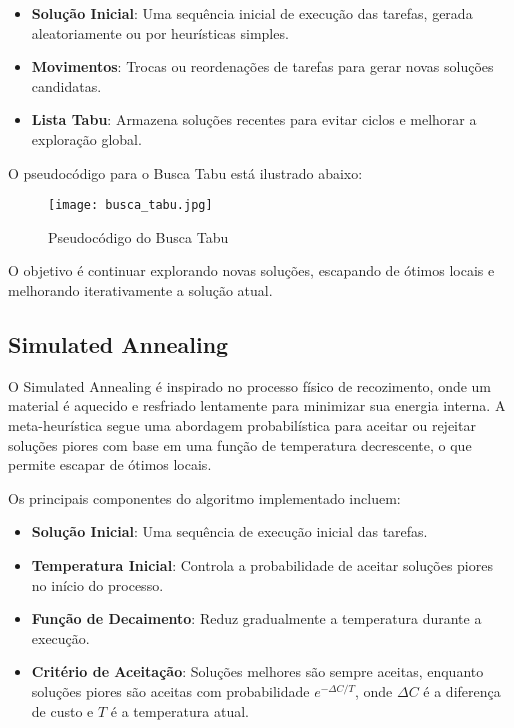 \documentclass[12pt]{article}
\begin{document}
\begin{itemize}
    \item \textbf{Solução Inicial}: Uma sequência inicial de execução das tarefas, gerada aleatoriamente ou por heurísticas simples.
    \item \textbf{Movimentos}: Trocas ou reordenações de tarefas para gerar novas soluções candidatas.
    \item \textbf{Lista Tabu}: Armazena soluções recentes para evitar ciclos e melhorar a exploração global.
\end{itemize}

O pseudocódigo para o Busca Tabu está ilustrado abaixo:

\begin{figure}[h]  
    \centering 
    \texttt{[image: busca\_tabu.jpg]}  
    \caption{Pseudocódigo do Busca Tabu}  %
    \label{fig:busca_tabu}  %
\end{figure}


O objetivo é continuar explorando novas soluções, escapando de ótimos locais e melhorando iterativamente a solução atual.

\subsection{Simulated Annealing}

O Simulated Annealing é inspirado no processo físico de recozimento, onde um material é aquecido e resfriado lentamente para minimizar sua energia interna. A meta-heurística segue uma abordagem probabilística para aceitar ou rejeitar soluções piores com base em uma função de temperatura decrescente, o que permite escapar de ótimos locais.

Os principais componentes do algoritmo implementado incluem:

\begin{itemize}
    \item \textbf{Solução Inicial}: Uma sequência de execução inicial das tarefas.
    \item \textbf{Temperatura Inicial}: Controla a probabilidade de aceitar soluções piores no início do processo.
    \item \textbf{Função de Decaimento}: Reduz gradualmente a temperatura durante a execução.
    \item \textbf{Critério de Aceitação}: Soluções melhores são sempre aceitas, enquanto soluções piores são aceitas com probabilidade $e^{-\Delta C / T}$, onde $\Delta C$ é a diferença de custo e $T$ é a temperatura atual.
\end{itemize}
\end{document}
